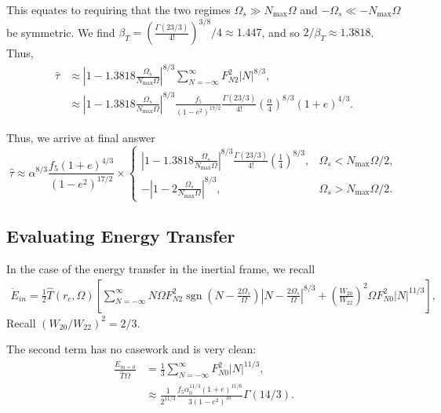 \documentclass[
        fleqn,
        usenatbib,
        referee,
    ]{mnras}
\newcommand*{\abs}[1]{\left|#1\right|}
\newcommand*{\p}[1]{\left(#1\right)}
\newcommand*{\s}[1]{\left[#1\right]}
\DeclareMathOperator*{\sgn}{sgn}
\begin{document}
\begin{itemize}
        This equates to requiring that the two regimes $\Omega_s \gg
        N_{\max}\Omega$ and $-\Omega_s \ll -N_{\max}\Omega$ be symmetric. We
        find $\beta_T = \p{\frac{\Gamma\p{23/3}}{4!}}^{3/8}/4 \approx 1.447$,
        and so $2/\beta_T \approx 1.3818$. Thus,
        \begin{align}
            \hat{\tau}
                &\approx \abs{1 - 1.3818\frac{\Omega_s}{N_{\max}\Omega}}^{8/3}
                    \sum\limits_{N = -\infty}^\infty F_{N2}^2 \abs{N}^{8/3},\\
                &\approx \abs{1 - 1.3818\frac{\Omega_s}{N_{\max}\Omega}}^{8/3}
                    \frac{f_5}{\p{1 - e^2}^{17/2}}
                    \frac{\Gamma(23/3)}{4!}\p{\frac{\alpha}{4}}^{8/3}
                        \p{1 + e}^{4/3}.
        \end{align}
\end{itemize}
Thus, we arrive at final answer
\begin{equation}
    \hat{\tau} \approx \alpha^{8/3}
        \frac{f_5\p{1 + e}^{4/3}}{\p{1 - e^2}^{17/2}} \times
    \begin{cases}
        \abs{1 - 1.3818\frac{\Omega_s}{N_{\max}\Omega}}^{8/3}
            \frac{\Gamma(23/3)}{4!}\p{\frac{1}{4}}^{8/3},
            & \Omega_s < N_{\max}\Omega / 2,\\[5pt]
        -\abs{1 - 2\frac{\Omega_s}{N_{\max}\Omega}}^{8/3},
            & \Omega_s > N_{\max}\Omega / 2.
    \end{cases}\label{eq:traveling_torque}
\end{equation}

\subsection{Evaluating Energy Transfer}

In the case of the energy transfer in the inertial frame, we recall
\begin{align}
     \dot{E}_{in} = \frac{1}{2}\hat{T}\p{r_c, \Omega}\s{
         \sum\limits_{N = -\infty}^\infty
            N\Omega F_{N2}^2 \sgn \p{N - \frac{2\Omega_s}{\Omega}} \abs{N -
            \frac{2\Omega_s}{\Omega}}^{8/3}
            + \p{\frac{W_{20}}{W_{22}}}^2\Omega F_{N0}^2 \abs{N}^{11/3}},
\end{align}
Recall $\p{W_{20} / W_{22}}^2 = 2/3$.

The second term has no casework and is very clean:
\begin{align}
    \frac{\dot{E}_{m=0}}{\hat{T}\Omega}
        &= \frac{1}{3} \sum\limits_{N = -\infty}^\infty
            F_{N0}^2\abs{N}^{11/3},\\
        &\approx \frac{1}{2^{11/3}}
            \frac{f_5 \alpha_0^{11/3}\p{1 + e}^{11/6}}{3\p{1 - e^2}^{10}}
            \Gamma\p{14/3}.
\end{align}
\end{document}
